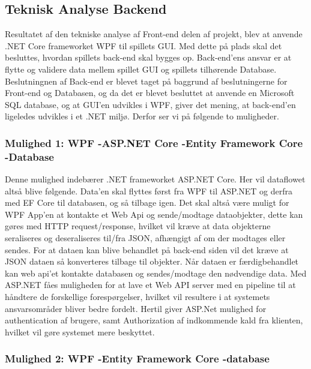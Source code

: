 \subsection{Teknisk Analyse Backend}
\label{ssec: Teknisk Analyse Backend}
Resultatet af den tekniske analyse af Front-end delen af projekt, blev at anvende .NET Core frameworket WPF til spillets GUI. Med dette på plads skal det besluttes, hvordan spillets back-end skal bygges op. Back-end’ens ansvar er at flytte og validere data mellem spillet GUI og spillets tilhørende Database. Beslutningnen af Back-end er blevet taget på baggrund af beslutningerne for Front-end og Databasen, og da det er blevet besluttet at anvende en Microsoft SQL database, og at GUI’en udvikles i WPF, giver det mening, at back-end’en ligeledes udvikles i et .NET miljø. Derfor ser vi på følgende to muligheder.\\


\subsubsection{Mulighed 1: WPF -\g ASP.NET Core -\g Entity Framework Core -\g Database}
Denne mulighed indebærer .NET frameworket ASP.NET Core. Her vil dataflowet altså blive følgende. Data’en skal flyttes først fra WPF til ASP.NET og derfra med EF Core\cite{Entity Framework Core} til databasen, og så tilbage igen.
Det skal altså være muligt for WPF App’en at kontakte et Web Api og sende/modtage dataobjekter, dette kan gøres med HTTP request/response, hvilket vil kræve at data objekterne seraliseres og deseraliseres til/fra JSON, afhængigt af om der modtages eller sendes. For at dataen kan blive behandlet på back-end siden vil det kræve at JSON dataen så konverteres tilbage til objekter. Når dataen er færdigbehandlet kan web api’et kontakte databasen og sendes/modtage den nødvendige data. Med ASP.NET fåes muligheden for at lave et Web API server med en pipeline til at håndtere de forskellige forespørgelser, hvilket vil resultere i at systemets ansvarsområder bliver bedre fordelt. Hertil giver ASP.Net mulighed for authentication af brugere, samt Authorization af indkommende kald fra klienten, hvilket vil gøre systemet mere beskyttet. \\


\subsubsection{Mulighed 2: WPF -\g Entity Framework Core -\g database}

